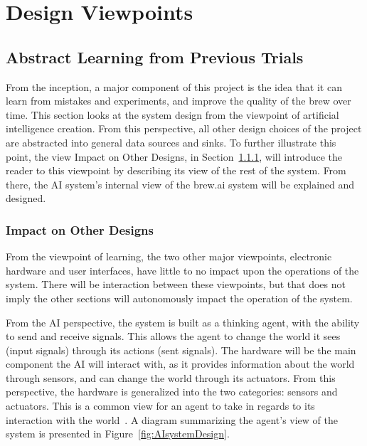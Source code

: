 \documentclass[draftclsnofoot,onecolumn,letterpaper,10pt]{IEEEtran}
\begin{document}
\section{Design Viewpoints}

\subsection{Abstract Learning from Previous Trials}\label{sec:learning}%
From the inception, a major component of this project is the idea that it can learn from mistakes and experiments, and improve the quality of the brew over time.
This section looks at the system design from the viewpoint of artificial intelligence creation.
From this perspective, all other design choices of the project are abstracted into general data sources and sinks.
To further illustrate this point, the view Impact on Other Designs, in Section~\ref{sec:AIImpact}, will introduce the reader to this viewpoint by describing its view of the rest of the system.
From there, the AI system's internal view of the brew.ai system will be explained and designed.

\subsubsection{Impact on Other Designs}\label{sec:AIImpact}
From the viewpoint of learning, the two other major viewpoints, electronic hardware and user interfaces, have little to no impact upon the operations of the system.
There will be interaction between these viewpoints, but that does not imply the other sections will autonomously impact the operation of the system.

From the AI perspective, the system is built as a thinking agent, with the ability to send and receive signals.
This allows the agent to change the world it sees (input signals) through its actions (sent signals).
The hardware will be the main component the AI will interact with, as it provides information about the world through sensors, and can change the world through its actuators.
From this perspective, the hardware is generalized into the two categories: sensors and actuators.
This is a common view for an agent to take in regards to its interaction with the world~\cite{RussellNorvig}.
A diagram summarizing the agent's view of the system is presented in Figure~\ref{fig:AIsystemDesign}.
\end{document}
